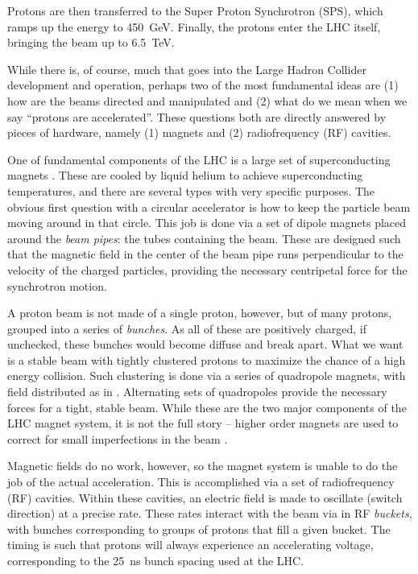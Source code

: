 Protons are then transferred to the Super Proton Synchrotron (SPS), which ramps up the energy to 
\SI{450}{\GeV}. Finally, the protons enter the LHC itself, bringing the beam up to \SI{6.5}{\TeV}. 

While there is, of course, much that goes into the Large Hadron Collider development and operation, perhaps
two of the most fundamental ideas are (1) how are the beams directed and manipulated and (2) what do we 
mean when we say ``protons are accelerated''. These questions both are directly answered by pieces of hardware,
namely (1) magnets and (2) radiofrequency (RF) cavities.

One of fundamental components of the LHC is a large set of superconducting magnets . These 
are cooled by liquid helium to achieve superconducting temperatures, and there are several types with very 
specific purposes. The obvious first question with a circular accelerator is how to keep the particle beam 
moving around in that circle. This job is done via a set of dipole magnets placed around the \emph{beam pipes}: the 
tubes containing the beam. These are designed such that the magnetic field in the center of the beam pipe runs 
perpendicular to the velocity of the charged particles, providing the necessary centripetal force for 
the synchrotron motion.

A proton beam is not made of a single proton, however, but of many protons, grouped into a series of \emph{bunches}.
As all of these are positively charged, if unchecked, these bunches would become diffuse and break apart. What we 
want is a stable beam with tightly clustered protons to maximize the chance of a high energy collision.
Such clustering is done via a series of quadropole magnets, with field distributed as in 
. Alternating sets of quadropoles provide the necessary forces for a tight, 
stable beam. While these are the two major components of the LHC magnet system, it is not the full story -- higher order 
magnets are used to correct for small imperfections in the beam .

Magnetic fields do no work, however, so the magnet system is unable to do the job of the actual acceleration. This is 
accomplished via a set of radiofrequency (RF) cavities. Within these cavities, an electric field is made to 
oscillate (switch direction) at a precise rate. These rates interact with the beam via in RF \emph{buckets}, with 
bunches corresponding to groups of protons that fill a given bucket. The timing is such that protons will always 
experience an accelerating voltage, corresponding to the \SI{25}{\ns} bunch spacing used at the LHC.

